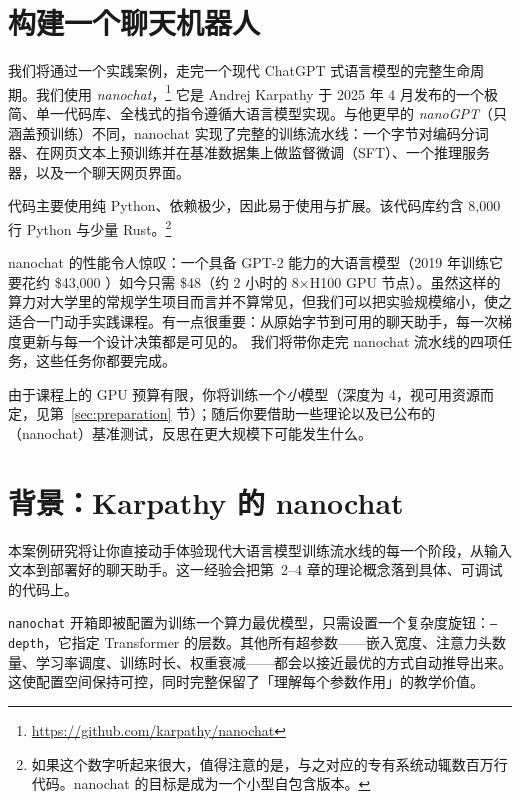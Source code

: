 \section{构建一个聊天机器人}
我们将通过一个实践案例，走完一个现代 ChatGPT 式语言模型的完整生命周期。我们使用 \textit{nanochat}，\footnote{\url{https://github.com/karpathy/nanochat}} 它是 Andrej Karpathy 于 2025 年 4 月发布的一个极简、单一代码库、全栈式的指令遵循大语言模型实现。与他更早的 \textit{nanoGPT}（只涵盖预训练）不同，nanochat 实现了完整的训练流水线：一个字节对编码分词器、在网页文本上预训练并在基准数据集上做监督微调（SFT）、一个推理服务器，以及一个聊天网页界面。

代码主要使用纯 Python、依赖极少，因此易于使用与扩展。该代码库约含 8{,}000 行 Python 与少量 Rust。\footnote{如果这个数字听起来很大，值得注意的是，与之对应的专有系统动辄数百万行代码。nanochat 的目标是成为一个小型自包含版本。}

nanochat 的性能令人惊叹：一个具备 GPT-2 能力的大语言模型（2019 年训练它要花约 \$43,000 \citep{radford2019language}）如今只需 \$48（约 2 小时的 8×H100 GPU 节点）。虽然这样的算力对大学里的常规学生项目而言并不算常见，但我们可以把实验规模缩小，使之适合一门动手实践课程。有一点很重要：从原始字节到可用的聊天助手，每一次梯度更新与每一个设计决策都是可见的。
我们将带你走完 nanochat 流水线的四项任务，这些任务你都要完成。

由于课程上的 GPU 预算有限，你将训练一个\emph{小}模型（深度为 4，视可用资源而定，见第~\ref{sec:preparation} 节）；随后你要借助一些理论以及已公布的（nanochat）基准测试，反思在更大规模下可能发生什么。

\label{sec:learning-goals}

\section{背景：Karpathy 的 nanochat}
\label{sec:background}
本案例研究将让你直接动手体验现代大语言模型训练流水线的每一个阶段，从输入文本到部署好的聊天助手。这一经验会把第~2--4 章的理论概念落到具体、可调试的代码上。



\texttt{nanochat} 开箱即被配置为训练一个算力最优模型，只需设置一个复杂度旋钮：\texttt{--depth}，它指定 Transformer 的层数。其他所有超参数——嵌入宽度、注意力头数量、学习率调度、训练时长、权重衰减——都会以接近最优的方式自动推导出来。这使配置空间保持可控，同时完整保留了「理解每个参数作用」的教学价值。

